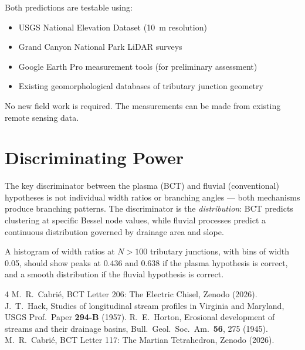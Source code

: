 \documentclass[aps,prl,twocolumn,superscriptaddress]{revtex4-2}
\begin{document}
Both predictions are testable using:
\begin{itemize}
\item USGS National Elevation Dataset (10~m resolution)
\item Grand Canyon National Park LiDAR surveys
\item Google Earth Pro measurement tools (for preliminary assessment)
\item Existing geomorphological databases of tributary junction geometry
\end{itemize}

No new field work is required. The measurements can be made from existing remote sensing data.

\section{Discriminating Power}

The key discriminator between the plasma (BCT) and fluvial (conventional) hypotheses is not individual width ratios or branching angles --- both mechanisms produce branching patterns. The discriminator is the \emph{distribution}: BCT predicts clustering at specific Bessel node values, while fluvial processes predict a continuous distribution governed by drainage area and slope.

A histogram of width ratios at $N > 100$ tributary junctions, with bins of width 0.05, should show peaks at $0.436$ and $0.638$ if the plasma hypothesis is correct, and a smooth distribution if the fluvial hypothesis is correct.

\begin{thebibliography}{4}
 M.~R.~Cabri\'e, BCT Letter 206: The Electric Chisel, Zenodo (2026).
 J.~T.~Hack, Studies of longitudinal stream profiles in Virginia and Maryland, USGS Prof.\ Paper \textbf{294-B} (1957).
 R.~E.~Horton, Erosional development of streams and their drainage basins, Bull.\ Geol.\ Soc.\ Am.\ \textbf{56}, 275 (1945).
 M.~R.~Cabri\'e, BCT Letter 117: The Martian Tetrahedron, Zenodo (2026).
\end{thebibliography}
\end{document}
